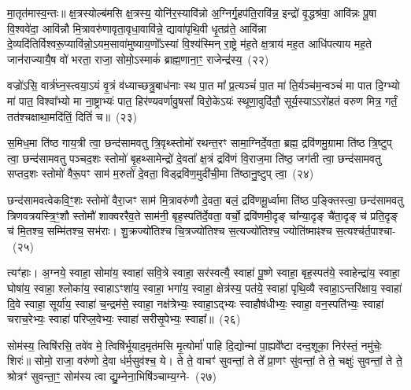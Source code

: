 मा॒तृत॑मास्व॒न्तः॥ क्ष॒त्रस्योल्ब॑मसि क्ष॒त्रस्य॒ योनि॑र॒स्यावि॑न्नो अ॒ग्निर्गृ॒हप॑ति॒रावि॑न्न॒ इन्द्रो॑ वृ॒द्धश्र॑वा॒ आवि॑न्नः पू॒षा वि॒श्ववे॑दा॒ आवि॑न्नौ मि॒त्रावरु॑णावृता॒वृधा॒वावि॑न्ने॒ द्यावा॑\-पृथि॒वी धृ॒तव्र॑ते॒ आवि॑न्ना दे॒व्यदि॑तिर्विश्वरू॒प्यावि॑न्नो॒\-ऽयम॒सावा॑मुष्याय॒णो᳚\-ऽस्यां वि॒श्य॑स्मिन् रा॒ष्ट्रे म॑ह॒ते क्ष॒त्राय॑ मह॒त आधि॑पत्याय मह॒ते जान॑राज्यायै॒ष वो॑ भरता॒ राजा॒ सोमो॒\-ऽस्माकं॑ ब्राह्म॒णाना॒ꣳ॒ राजेन्द्र॑स्य॒~(२२)\ip

वज्रो॑\-ऽसि॒ वार्त्र॑घ्न॒स्त्वया॒\-ऽयं वृ॒त्रं व॑ध्याच्छत्रु॒बाध॑नाः स्थ पा॒त मा᳚ प्र॒त्यञ्चं॑ पा॒त मा॑ ति॒र्यञ्च॑म॒न्वञ्चं॑ मा पात दि॒ग्भ्यो मा॑ पात॒ विश्वा᳚भ्यो मा ना॒ष्ट्राभ्यः॑ पात॒ हिर॑ण्यवर्णावु॒षसां᳚ विरो॒के\-ऽयः॑ स्थूणा॒वुदि॑तौ॒ सूर्य॒स्या\-ऽऽ\-रो॑हतं वरुण मित्र॒ गर्तं॒ तत॑श्चक्षाथा॒मदि॑तिं॒ दितिं॑ च॥~(२३)\ip

{\anuvakamend[{शिशु॒रिन्द्र॒स्यैक॑चत्वारिꣳशच्च}]}%

स॒मिध॒मा ति॑ष्ठ गाय॒त्री त्वा॒ छन्द॑सामवतु त्रि॒वृथ्स्तोमो॑ रथन्त॒रꣳ सामा॒ग्निर्दे॒वता॒ ब्रह्म॒ द्रवि॑णमु॒ग्रामा ति॑ष्ठ त्रि॒ष्टुप् त्वा॒ छन्द॑सामवतु पञ्चद॒शः स्तोमो॑ बृ॒हथ्सामेन्द्रो॑ दे॒वता᳚ क्ष॒त्रं द्रवि॑णं वि॒राज॒मा ति॑ष्ठ॒ जग॑ती त्वा॒ छन्द॑सामवतु सप्तद॒शः स्तोमो॑ वैरू॒पꣳ साम॑ म॒रुतो॑ दे॒वता॒ विड्द्रवि॑ण॒मुदी॑ची॒मा ति॑ष्ठानु॒ष्टुप् त्वा॒~(२४)\ip

छन्द॑सामवत्वेकवि॒ꣳ॒शः स्तोमो॑ वैरा॒जꣳ साम॑ मि॒त्रावरु॑णौ दे॒वता॒ बलं॒ द्रवि॑णमू॒र्ध्वामा ति॑ष्ठ प॒ङ्क्तिस्त्वा॒ छन्द॑सामवतु त्रिणवत्रयस्त्रि॒ꣳ॒शौ स्तोमौ॑ शाक्वररैव॒ते साम॑नी॒ बृह॒स्पति॑र्दे॒वता॒ वर्चो॒ द्रवि॑णमी॒दृङ् चा᳚न्या॒दृङ् चै॑ता॒दृङ् च॑ प्रति॒दृङ् च॑ मि॒तश्च॒ सम्मि॑तश्च॒ सभ॑राः। शु॒क्रज्यो॑तिश्च चि॒त्रज्यो॑तिश्च स॒त्यज्यो॑तिश्च॒ ज्योति॑ष्माꣴश्च स॒त्यश्च॑र्त॒पाश्चा-~(२५)\ip

त्यꣳ॑हाः। अ॒ग्नये॒ स्वाहा॒ सोमा॑य॒ स्वाहा॑ सवि॒त्रे स्वाहा॒ सर॑स्वत्यै॒ स्वाहा॑ पू॒ष्णे स्वाहा॒ बृह॒स्पत॑ये॒ स्वाहेन्द्रा॑य॒ स्वाहा॒ घोषा॑य॒ स्वाहा॒ श्लोका॑य॒ स्वाहा\-ऽꣳशा॑य॒ स्वाहा॒ भगा॑य॒ स्वाहा॒ क्षेत्र॑स्य॒ पत॑ये॒ स्वाहा॑ पृथि॒व्यै स्वाहा॒\-ऽन्तरि॑क्षाय॒ स्वाहा॑ दि॒वे स्वाहा॒ सूर्या॑य॒ स्वाहा॑ च॒न्द्रम॑से॒ स्वाहा॒ नक्ष॑त्रेभ्यः॒ स्वाहा॒\-ऽद्भ्यः स्वाहौष॑धीभ्यः॒ स्वाहा॒ वन॒स्पति॑भ्यः॒ स्वाहा॑ चराच॒रेभ्यः॒ स्वाहा॑ परिप्ल॒वेभ्यः॒ स्वाहा॑ सरीसृ॒पेभ्यः॒ स्वाहा᳚॥~(२६)\ip

{\anuvakamend[{अ॒नु॒ष्टुप्त्व॑र्त॒पाश्च॑ सरीसृ॒पेभ्यः॒ स्वाहा᳚}]}%

सोम॑स्य॒ त्विषि॑रसि॒ तवे॑व मे॒ त्विषि॑र्भूयाद॒मृत॑मसि मृ॒त्योर्मा॑ पाहि दि॒द्योन्मा॑ पा॒ह्यवे᳚ष्टा दन्द॒शूका॒ निर॑स्तं॒ नमु॑चेः॒ शिरः॑॥ सोमो॒ राजा॒ वरु॑णो दे॒वा ध॑र्म॒सुव॑श्च॒ ये। ते ते॒ वाचꣳ॑ सुवन्तां॒ ते ते᳚ प्रा॒णꣳ सु॑वन्तां॒ ते ते॒ चक्षुः॑ सुवन्तां॒ ते ते॒ श्रोत्रꣳ॑ सुवन्ता॒ꣳ॒ सोम॑स्य त्वा द्यु॒म्नेना॒भिषि॑ञ्चाम्य॒ग्ने-~(२७)\ip

